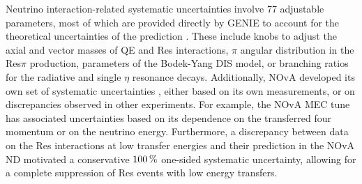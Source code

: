
Neutrino interaction-related systematic uncertainties involve 77 adjustable parameters, most of which are provided directly by GENIE \cite{GENIE.pdf} to account for the theoretical uncertainties of the prediction \cite{NOvAResults2021.pdf}. These include knobs to adjust the axial and vector masses of \gls{QE} and \gls{Res} interactions, $\pi$ angular distribution in the \gls{Res}$\pi$ production, parameters of the Bodek-Yang \gls{DIS} model, or branching ratios for the radiative and single $\eta$ resonance decays. Additionally, \gls{NOvA} developed its own set of systematic uncertainties \cite{NOvANuIntUncertaintiesFromNDData2020.pdf}, either based on its own measurements, or on discrepancies observed in other experiments. For example, the \gls{NOvA} \gls{MEC} tune has associated uncertainties based on its dependence on the transferred four momentum or on the neutrino energy. Furthermore, a discrepancy between data on the \gls{Res} interactions at low transfer energies and their prediction in the \gls{NOvA} \gls{ND} motivated a conservative $\unit[100]{\%}$ one-sided systematic uncertainty, allowing for a complete suppression of \gls{Res} events with low energy transfers.





